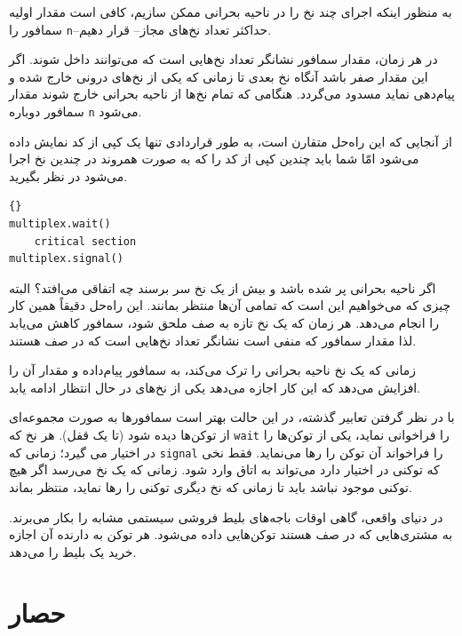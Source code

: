 \documentclass{book}
\begin{document}
    به منظور اینکه  اجرای چند نخ را در ناحیه بحرانی ممکن سازیم، کافی است مقدار اولیه سمافور را \texttt{n}--حداکثر تعداد نخ‌های مجاز-- قرار دهیم.
    
    در هر زمان، مقدار سمافور نشانگر تعداد نخ‌هایی است که می‌توانند داخل شوند. اگر این مقدار صفر باشد آنگاه 
    نخ بعدی تا زمانی که یکی از نخ‌های درونی خارج شده و پیام‌دهی نماید مسدود می‌گردد. هنگامی که تمام نخ‌ها از ناحیه بحرانی 
    خارج شوند مقدار سمافور دوباره \texttt{n} می‌شود. 
    
    از آنجایی که این راه‌حل متقارن است، به طور قراردادی تنها یک کپی از کد نمایش داده می‌شود امّا شما باید چندین کپی از کد را که به صورت همروند 
    در چندین نخ اجرا می‌شود در نظر بگیرید. 

\begin{latin}
\begin{lstlisting}[title=\rl{ راه‌حل مالتی‌پلکس}]{}
multiplex.wait()
    critical section 
multiplex.signal()      
\end{lstlisting}
\end{latin}

    اگر ناحیه بحرانی پر شده باشد و بیش از یک نخ سر برسند چه اتفاقی می‌افتد؟ البته چیزی که می‌خواهیم این است که تمامی آن‌ها منتظر بمانند. 
    این راه‌حل دقیقاً همین کار را انجام می‌دهد. هر زمان که یک نخ تازه به صف ملحق شود، سمافور کاهش می‌یابد لذا مقدار سمافور که 
    منفی است نشانگر تعداد نخ‌هایی است که در صف هستند. 
    
    زمانی که یک نخ ناحیه بحرانی را ترک می‌کند، به سمافور پیام‌داده و مقدار آن را افزایش می‌دهد که این کار اجازه می‌دهد یکی از نخ‌های در حال انتظار ادامه یابد. 

    با در نظر گرفتن تعابیر گذشته،‌ در این حالت بهتر است سمافورها به صورت مجموعه‌ای از توکن‌ها دیده شود (تا یک قفل). 
    هر نخ که \texttt{wait} را فراخوانی نماید،  یکی از توکن‌ها را در اختیار می گیرد؛‌ زمانی که \texttt{signal} را فراخواند 
    آن توکن را رها می‌نماید. فقط نخی که توکنی در اختیار دارد می‌تواند به اتاق وارد شود.  زمانی که یک نخ می‌رسد اگر هیچ توکنی موجود نباشد 
    باید تا زمانی که نخ دیگری توکنی را رها نماید، منتظر بماند. 

    در دنیای واقعی، گاهی  اوقات باجه‌های بلیط فروشی سیستمی مشابه را بکار می‌برند. 
    به مشتری‌هایی که در صف هستند توکن‌هایی داده می‌شود. هر توکن به دارنده آن اجازه خرید یک بلیط را می‌دهد. 



\section{حصار}
\end{document}
